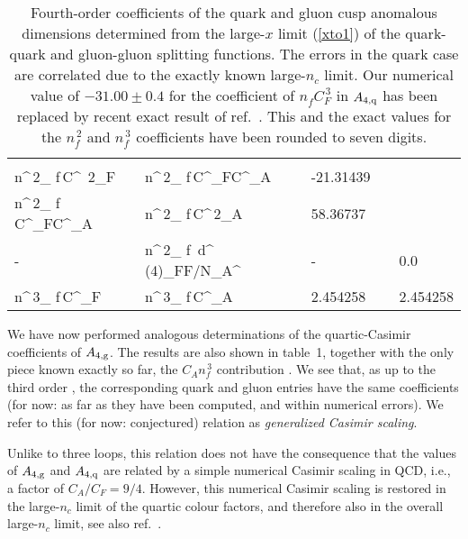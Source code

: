 \documentclass[12pt]{article}
\def\ca{{C^{}_A}}
\def\cas{{C^{\,2}_A}}
\def\cf{{C^{}_F}}
\def\cfs{{C^{\, 2}_F}}
\def\cft{{C^{\, 3}_F}}
\def\nf{{n^{}_{\! f}}}
\def\nfs{{n^{\,2}_{\! f}}}
\def\nft{{n^{\,3}_{\! f}}}
\begin{document}
\begin{table}[b!]
\begin{tabular}{MMMM}
\hline\\[-3.5mm]
    \nfs\,\cfs   & \nfs\,\cf\ca &   -21.31439                &                          \\[-0.3mm]
  \nfs\,\cf\ca   & \nfs\,\cas   & \phantom{-}58.36737        &                          \\[-0.3mm]
       -         & \nfs\, d^{\,(4)}_{F\!F}/N_{\!A}^{}  
                                &      -                     & ~~\phantom{-}0.0  \\[-0.3mm]
    \nft\,\cf    & \nft\,\ca    & \phantom{-}2.454258        & ~~\phantom{-}2.454258    \\[0.2mm]
  \hline
  \end{tabular}
  \vspace*{1mm}
  \caption{\small \label{tab:AB}
  Fourth-order coefficients of the quark and gluon cusp anomalous dimensions
  determined from the large-$x$ limit (\ref{xto1}) of the quark-quark and
  gluon-gluon splitting functions. The errors in the quark case are correlated
  due to the exactly known large-$n_c$ limit.
  Our numerical value of $-31.00 \pm 0.4$ \cite{MRUVV1} for the coefficient of 
  $\nf \cft$ in $A_{4,\rm q}$ has been replaced by recent exact result of 
  ref.~\cite{Grozin18}. 
  This and the exact values for the $\nfs$ and $\nft$ coefficients have been 
  rounded to seven digits.
  }
  \vspace*{-2mm}
\end{table}

We have now performed analogous determinations of the quartic-Casimir
coefficients of $A_{4,\rm g}$. The results are also shown in table~1, together
with the only piece known exactly so far, the $C_A \nft$ contribution
\cite{DRUVV,gFFnf3}. We see that, as up to the third order \cite{MVV34},
the corresponding quark and gluon entries have the same coefficients
(for now: as far as they have been computed, and within numerical errors).
We refer to this (for now: conjectured) relation as {\em generalized Casimir
scaling}.

Unlike to three loops, this relation does not have the consequence that the
values of $A_{4,\rm g}$ and $A_{4,\rm q}$ are related by a simple numerical 
Casimir scaling in QCD, i.e., a factor of $C_A / C_F = 9/4$. 
However, this numerical Casimir scaling is restored in the large-$n_c$ limit 
of the quartic colour factors, and therefore also in the overall large-$n_c$ 
limit, see also ref.~\cite{Dixon17}.
\end{document}
